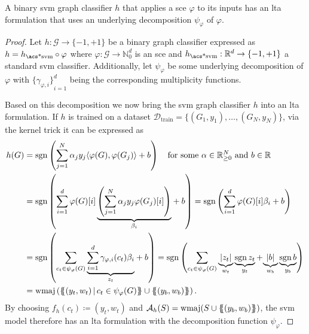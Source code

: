 \begin{thm}\label{thm:ltag:svm-ltag-formulation}
	A binary \ac{svm} graph classifier $h$ that applies a \ac{sce} $\varphi$ to its inputs has an \ac{lta} formulation that uses an underlying decomposition $\psi_{\varphi}$ of $\varphi$.
\end{thm}
\begin{proof}
	Let $h: \mathcal{G} \to {\{ -1, +1 \}}$ be a binary graph classifier expressed as $h = h_{\text{\acs*{svm}}} \circ \varphi$ where $\varphi: \mathcal{G} \to \mathbb{N}_0^{d}$ is an \ac{sce} and $h_{\text{\acs*{svm}}}: \mathbb{R}^{d} \to {\{ -1, +1 \}}$ a standard \ac{svm} classifier.
	Additionally, let $\psi_{\varphi}$ be some underlying decomposition of $\varphi$ with ${\{ \gamma_{\varphi, i} \}}_{i=1}^d$ being the corresponding multiplicity functions.

	Based on this decomposition we now bring the \ac{svm} graph classifier $h$ into an \ac{lta} formulation.
	If $h$ is trained on a dataset $\mathcal{D}_{\text{train}} = {\{ (G_1, y_1), \dots, (G_N, y_N) \}}$, via the kernel trick it can be expressed as
	\begin{align*}
		h(G) &= \sgn\left( \sum_{j = 1}^{N} \alpha_j y_j {\langle \varphi(G), \varphi(G_j) \rangle} + b \right)
		\quad\text{for some $\alpha \in \mathbb{R}_{\geq 0}^N$ and $b \in \mathbb{R}$} \\
		&= \sgn\left( {\sum_{i=1}^{d} {
				\varphi(G)[i]
				\underbrace{\left( \sum_{j = 1}^{N} \alpha_j y_j {\varphi(G_j)}[i] \right)}_{\beta_i}}
			} + b \right)
		 = \sgn\left( {\sum_{i=1}^{d} \varphi(G)[i] \beta_i} + b \right) \\
		&= \sgn\left( {\sum_{c_t \in \psi_{\varphi}(G)} \underbrace{\sum_{i = 1}^d \gamma_{\varphi, i}(c_t) \beta_i}_{z_t}} + b \right)
		 = \sgn\left( {\sum_{c_t \in \psi_{\varphi}(G)}} \underbrace{|z_t|}_{w_t} \underbrace{\sgn{z_t}}_{y_t} + {\underbrace{|b|}_{w_b} \underbrace{\sgn{b}}_{y_b}} \right) \\
		&= \wmaj\left( \ldblbrace (y_t, w_t)\, |\, c_t \in \psi_{\varphi}(G) \rdblbrace \cup \ldblbrace (y_b, w_b) \rdblbrace \right)
		\text{.}
	\end{align*}
	By choosing $f_h(c_t) \coloneqq (y_t, w_t)$ and $\mathcal{A}_h(S) = \wmaj(S \cup \ldblbrace (y_b, w_b) \rdblbrace)$, the \ac{svm} model therefore has an \ac{lta} formulation with the decomposition function $\psi_{\varphi}$.


\end{proof}
